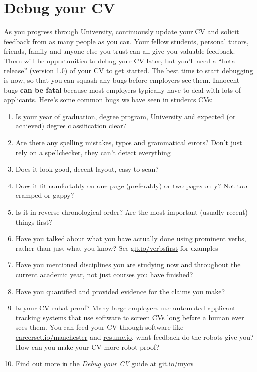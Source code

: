 \documentclass[
]{book}
\providecommand{\tightlist}{%
  \setlength{\itemsep}{0pt}\setlength{\parskip}{0pt}}
\begin{document}
\hypertarget{debug-your-cv}{%
\section{Debug your CV}\label{debug-your-cv}}

As you progress through University, continuously update your CV and solicit feedback from as many people as you can. Your fellow students, personal tutors, friends, family and anyone else you trust can all give you valuable feedback. There will be opportunities to debug your CV later, but you'll need a ``beta release'' (version 1.0) of your CV to get started. The best time to start debugging is now, so that you can squash any bugs before employers see them. Innocent bugs \textbf{can be fatal} because most employers typically have to deal with lots of applicants. Here's some common bugs we have seen in students CVs:

\begin{enumerate}
\def\labelenumi{\arabic{enumi}.}
\tightlist
\item
  Is your year of graduation, degree program, University and expected (or achieved) degree classification clear?
\item
  Are there any spelling mistakes, typos and grammatical errors? Don't just rely on a spellchecker, they can't detect everything
\item
  Does it look good, decent layout, easy to scan?
\item
  Does it fit comfortably on one page (preferably) or two pages only? Not too cramped or gappy?
\item
  Is it in reverse chronological order? Are the most important (usually recent) things first?
\item
  Have you talked about what you have actually done using prominent verbs, rather than just what you know? See \href{http://git.io/verbsfirst}{git.io/verbsfirst} for examples
\item
  Have you mentioned disciplines you are studying now and throughout the current academic year, not just courses you have finished?
\item
  Have you quantified and provided evidence for the claims you make?
\item
  Is your CV robot proof? Many large employers use automated applicant tracking systems that use software to screen CVs long before a human ever sees them. You can feed your CV through software like \href{http://careerset.io/manchester}{careerset.io/manchester} and \href{https://resume.io/}{resume.io}, what feedback do the robots give you? How can you make your CV more robot proof?
\item
  Find out more in the \emph{Debug your CV} \citep{debugcv} guide at \href{http://git.io/mycv}{git.io/mycv}
\end{enumerate}
\end{document}
